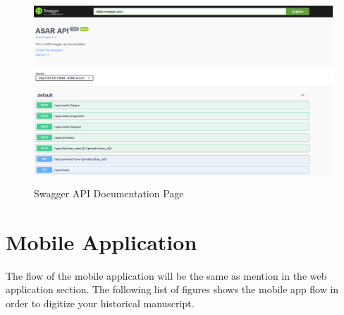 \begin{figure}[!htb]
    \centering
    \includegraphics[width=15cm,height=7cm]{images/app/web/web-api-docs.PNG}
    \caption{Swagger API Documentation Page}
    \label{fig:web-swagger}
\end{figure}

\section{Mobile Application}

The flow of the mobile application will be the same as mention in the web application section. The following list of figures shows the mobile app flow in order to digitize your historical manuscript.

